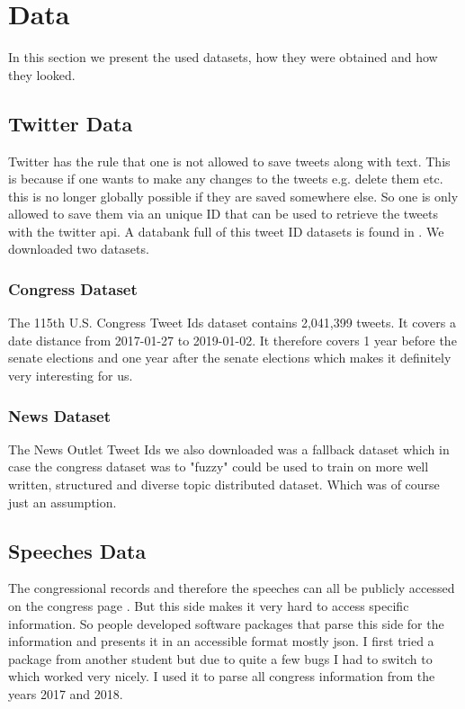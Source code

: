 \documentclass[10pt,conference,compsocconf]{IEEEtran}
\begin{document}
\section{Data}
\label{sec:Data}
In this section we present the used datasets, how they were obtained and how they looked. 
\subsection{Twitter Data}
Twitter has the rule that one is not allowed to save tweets along with text. This is because if one wants to make any changes to the tweets e.g. delete them etc. this is no longer globally possible if they are saved somewhere else. So one is only allowed to save them via an unique ID that can be used to retrieve the tweets with the twitter api. A databank full of this tweet ID datasets is found in \cite{twitter_datasets}. We downloaded two datasets.
\subsubsection{Congress Dataset}
The 115th U.S. Congress Tweet Ids dataset contains 2,041,399 tweets. It covers a date distance from 2017-01-27 to 2019-01-02. It therefore covers 1 year before the senate elections and one year after the senate elections which makes it definitely very interesting for us. 
\subsubsection{News Dataset}
The News Outlet Tweet Ids we also downloaded was a fallback dataset which in case the congress dataset was to "fuzzy" could be used to train on more well written, structured and diverse topic distributed dataset. Which was of course just an assumption. 
\subsection{Speeches Data}
The congressional records and therefore the speeches can all be publicly accessed on the congress page \cite{congress_page}. But this side makes it very hard to access specific information. So people developed software packages that parse this side for the information and presents it in an accessible format mostly json. I first tried a package from another student but due to quite a few bugs I had to switch to \cite{congress-downloader} which worked very nicely. I used it to parse all congress information from the years 2017 and 2018. 
\end{document}
